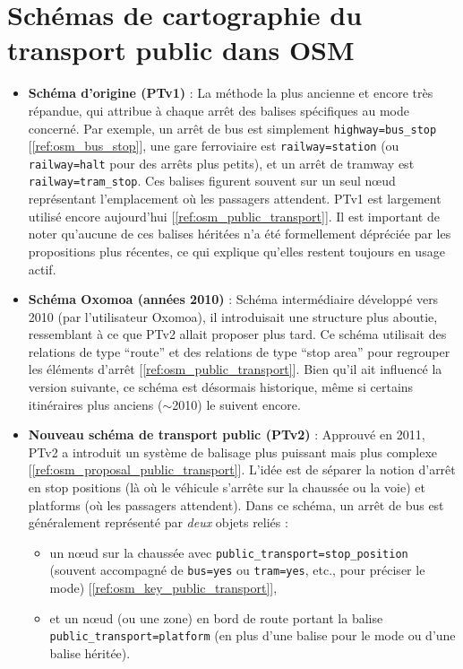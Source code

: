\section{Schémas de cartographie du transport public dans OSM}
\begin{itemize}
    \item \textbf{Schéma d'origine (PTv1)} : La méthode la plus ancienne et encore très répandue, qui attribue à chaque arrêt des balises spécifiques au mode concerné. Par exemple, un arrêt de bus est simplement \texttt{highway=bus\_stop} [\ref{ref:osm_bus_stop}], une gare ferroviaire est \texttt{railway=station} (ou \texttt{railway=halt} pour des arrêts plus petits), et un arrêt de tramway est \texttt{railway=tram\_stop}. Ces balises figurent souvent sur un seul nœud représentant l'emplacement où les passagers attendent.
    PTv1 est largement utilisé encore aujourd’hui [\ref{ref:osm_public_transport}].
    Il est important de noter qu’aucune de ces balises héritées n’a été formellement dépréciée par les propositions plus récentes, ce qui explique qu’elles restent toujours en usage actif.

    \item \textbf{Schéma Oxomoa (années 2010)} : Schéma intermédiaire développé vers 2010 (par l’utilisateur Oxomoa), il introduisait une structure plus aboutie, ressemblant à ce que PTv2 allait proposer plus tard. Ce schéma utilisait des relations de type ``route'' et des relations de type ``stop area'' pour regrouper les éléments d’arrêt [\ref{ref:osm_public_transport}]. Bien qu’il ait influencé la version suivante, ce schéma est désormais historique, même si certains itinéraires plus anciens ($\sim$2010) le suivent encore.

    \item \textbf{Nouveau schéma de transport public (PTv2)} : Approuvé en 2011, PTv2 a introduit un système de balisage plus puissant mais plus complexe [\ref{ref:osm_proposal_public_transport}]. L’idée est de séparer la notion d’arrêt en stop positions (là où le véhicule s’arrête sur la chaussée ou la voie) et platforms (où les passagers attendent). Dans ce schéma, un arrêt de bus est généralement représenté par \textit{deux} objets reliés :
    \begin{itemize}
        \item un nœud sur la chaussée avec \texttt{public\_transport=stop\_position} (souvent accompagné de \texttt{bus=yes} ou \texttt{tram=yes}, etc., pour préciser le mode) [\ref{ref:osm_key_public_transport}],
        \item et un nœud (ou une zone) en bord de route portant la balise \texttt{public\_transport=platform} (en plus d’une balise pour le mode ou d’une balise héritée).
    \end{itemize}
    

\end{itemize}
